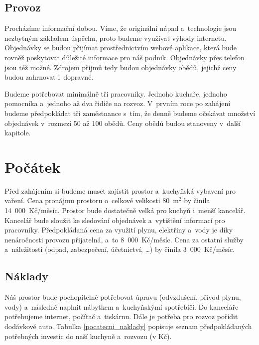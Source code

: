 \subsection{Provoz}
Procházíme informační dobou. Víme, že originální nápad a~technologie jsou nezbytným základem úspěchu, proto budeme využívat výhody internetu. Objednávky se budou při\-jímat prostřednictvím webové aplikace, která bude rovněž poskytovat důležité informace pro náš podnik. Objednávky přes telefon jsou též možné. Zdrojem příjmů tedy budou objednávky obědů, jejichž ceny budou zahrnovat i~dopravné.

Budeme potřebovat minimálně tři pracovníky. Jednoho kuchaře, jednoho pomocníka a~jednoho až dva řidiče na rozvoz. V~prvním roce po zahájení budeme předpokládat tři zaměstnance s~tím, že denně budeme očekávat množství objednávek v~rozmezí 50 až 100 obědů. Ceny obědů budou stanoveny v~další kapitole.





\section{Počátek} \label{sec_pocatek}
Před zahájením si budeme muset zajistit prostor a~kuchyňská vybavení pro vaření. Cena pronájmu prostoru o~celkové velikosti 80~m$^2$ by činila 14~000~Kč/měsíc. Prostor bude dostatečně velká pro kuchyň i~menší kancelář. Kancelář bude sloužit ke sledování objednávek a~vytištění informací pro pracovníky. Předpokládaná cena za využití plynu, elektřiny a~vody je díky nenáročnosti provozu přijatelná, a~to 8~000~Kč/měsíc. Cena za ostatní služby a~náležitosti (odpad, zabezpečení, účetnictví, \ldots) by činila 3~000~Kč/měsíc.

\subsection{Náklady}
Náš prostor bude pochopitelně potřebovat úpravu (odvzdušení, přívod plynu, vody) a~ná\-sledně naplnit nábytkem a~kuchyňskými spotřebiči. Do kanceláře potřebujeme internet, počítač a~tiskárnu. Dále je potřeba pro rozvoz pořídit dodávkové auto. Tabulka \ref{pocatecni_naklady} popisuje seznam předpokládaných potřebných investic do naší kuchyně a~rozvozu (v Kč).

